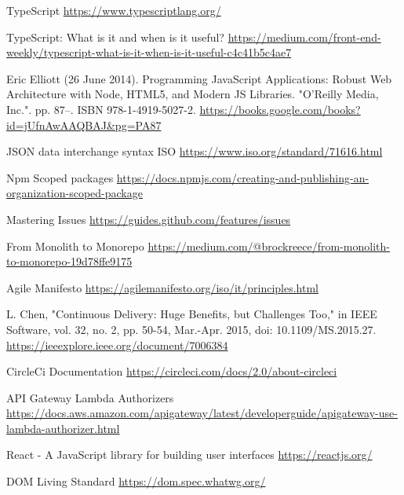 \begin{thebibliography}{9}
     TypeScript
    \url{https://www.typescriptlang.org/}

     TypeScript: What is it and when is it useful?
    \url{https://medium.com/front-end-weekly/typescript-what-is-it-when-is-it-useful-c4c41b5c4ae7}

     Eric Elliott (26 June 2014). Programming JavaScript Applications: Robust Web Architecture with Node, HTML5, and Modern JS Libraries. "O'Reilly Media, Inc.". pp. 87–. ISBN 978-1-4919-5027-2.
    \url{https://books.google.com/books?id=jUfnAwAAQBAJ&pg=PA87}

     JSON data interchange syntax ISO
    \url{https://www.iso.org/standard/71616.html}

     Npm Scoped packages
    \url{https://docs.npmjs.com/creating-and-publishing-an-organization-scoped-package}

     Mastering Issues
    \url{https://guides.github.com/features/issues}

     From Monolith to Monorepo
    \url{https://medium.com/@brockreece/from-monolith-to-monorepo-19d78ffe9175}

     Agile Manifesto
    \url{https://agilemanifesto.org/iso/it/principles.html}

     L. Chen, "Continuous Delivery: Huge Benefits, but Challenges Too," in IEEE Software, vol. 32, no. 2, pp. 50-54, Mar.-Apr. 2015, doi: 10.1109/MS.2015.27.
    \url{https://ieeexplore.ieee.org/document/7006384}


     CircleCi Documentation
    \url{https://circleci.com/docs/2.0/about-circleci}

     API Gateway Lambda Authorizers
    \url{https://docs.aws.amazon.com/apigateway/latest/developerguide/apigateway-use-lambda-authorizer.html}

     React - A JavaScript library for building user interfaces
    \url{https://reactjs.org/}

     DOM Living Standard
    \url{https://dom.spec.whatwg.org/}


\end{thebibliography}
